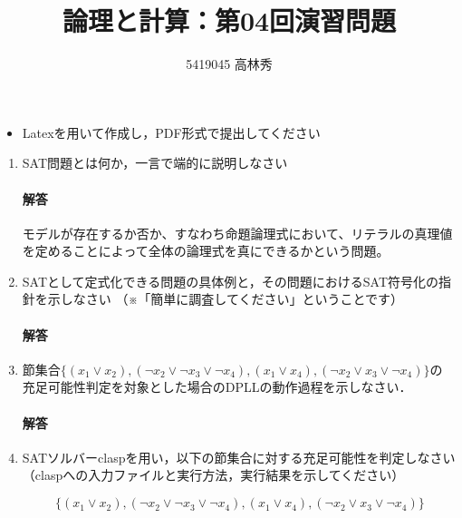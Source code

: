 \documentclass[dvipdfmx]{jsarticle}
\def\NO{04}
\def\LECTURENAME{論理と計算}
\begin{document}
\title{\LECTURENAME{}：第\NO{}回演習問題}

\author{5419045 高林秀}

\date{}
\maketitle

\begin{itemize}
\item Latexを用いて作成し，PDF形式で提出してください
\end{itemize}


\vspace*{\baselineskip}

\begin{enumerate}\setlength{\itemsep}{\baselineskip}

\item SAT問題とは何か，一言で端的に説明しなさい
\paragraph{解答}\par
モデルが存在するか否か、すなわち命題論理式において、リテラルの真理値を定めることによって全体の論理式を真にできるかという問題。

\item SATとして定式化できる問題の具体例と，その問題におけるSAT符号化の指針を示しなさい
  （※「簡単に調査してください」ということです）
\paragraph{解答}\par



\item 節集合$\{(x_1\lor x_2), (\neg x_2 \lor \neg x_3\lor  \neg x_4), (x_1\lor x_4), (\neg x_2\lor x_3\lor \neg x_4)\}$の
  充足可能性判定を対象とした場合のDPLLの動作過程を示しなさい．
\paragraph{解答}




\item SATソルバーclaspを用い，以下の節集合に対する充足可能性を判定しなさい
（claspへの入力ファイルと実行方法，実行結果を示してください）

\[
\{(x_1\lor x_2), (\neg x_2 \lor \neg x_3\lor  \neg x_4), (x_1\lor x_4), (\neg x_2\lor x_3\lor \neg x_4)\}
\]

\end{enumerate}
\end{document}
